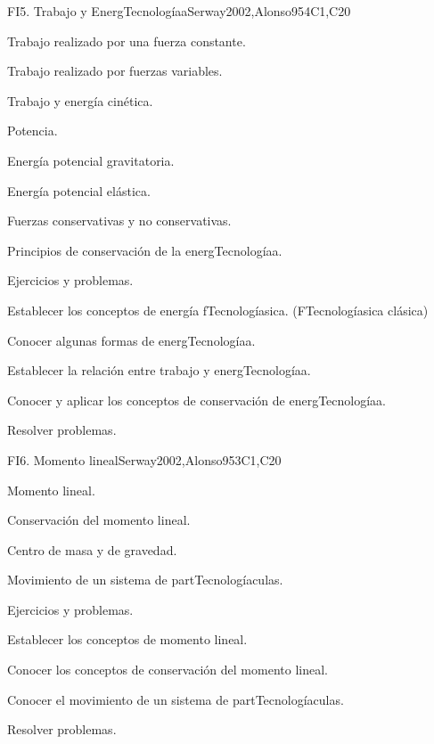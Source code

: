\begin{syllabus}
\begin{unit}{FI5. Trabajo y EnergTecnologíaa}{}{Serway2002,Alonso95}{4}{C1,C20}
\begin{topics}
	\item Trabajo realizado por una fuerza constante.
	\item Trabajo realizado por fuerzas variables.
	\item Trabajo y energía cinética.
	\item Potencia.
	\item Energía potencial gravitatoria.
	\item Energía potencial elástica.
	\item Fuerzas conservativas y no conservativas.
	\item Principios de conservación de la energTecnologíaa.
	\item Ejercicios y problemas.
\end{topics}

   \begin{learningoutcomes}
      \item Establecer los conceptos de energía fTecnologíasica. (FTecnologíasica clásica)
      \item Conocer algunas formas de energTecnologíaa.
      \item Establecer la relación entre trabajo y energTecnologíaa.
      \item Conocer y aplicar los conceptos de conservación de energTecnologíaa.
      \item Resolver problemas.
   \end{learningoutcomes}
\end{unit}

\begin{unit}{FI6. Momento lineal}{}{Serway2002,Alonso95}{3}{C1,C20}
\begin{topics}
      \item Momento lineal.
      \item Conservación del momento lineal.
      \item Centro de masa y de gravedad.
      \item Movimiento de un sistema de partTecnologíaculas.
      \item Ejercicios y problemas.
  \end{topics}

   \begin{learningoutcomes}
      \item Establecer los conceptos de momento lineal.
      \item Conocer los conceptos de conservación del momento lineal.
      \item Conocer el movimiento de un sistema de partTecnologíaculas.
      \item Resolver problemas.
   \end{learningoutcomes}
\end{unit}


\end{syllabus}

